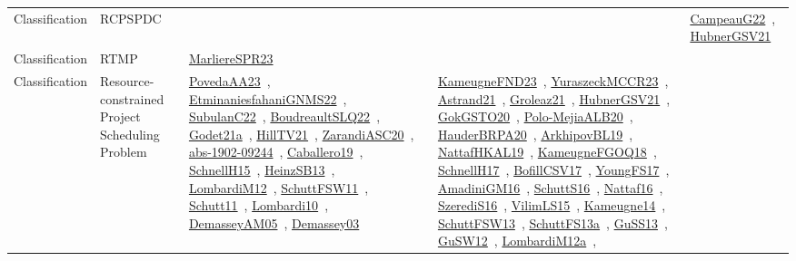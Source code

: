 {\begin{longtable}{lp{3cm}>{\raggedright\arraybackslash}p{6cm}>{\raggedright\arraybackslash}p{6cm}>{\raggedright\arraybackslash}p{8cm}}
Classification & RCPSPDC &  &  & \href{../works/CampeauG22.pdf}{CampeauG22}~\cite{CampeauG22}, \href{../works/HubnerGSV21.pdf}{HubnerGSV21}~\cite{HubnerGSV21}\\
Classification & RTMP & \href{../works/MarliereSPR23.pdf}{MarliereSPR23}~\cite{MarliereSPR23} &  & \\
Classification & Resource-constrained Project Scheduling Problem & \href{../works/PovedaAA23.pdf}{PovedaAA23}~\cite{PovedaAA23}, \href{../works/EtminaniesfahaniGNMS22.pdf}{EtminaniesfahaniGNMS22}~\cite{EtminaniesfahaniGNMS22}, \href{../works/SubulanC22.pdf}{SubulanC22}~\cite{SubulanC22}, \href{../works/BoudreaultSLQ22.pdf}{BoudreaultSLQ22}~\cite{BoudreaultSLQ22}, \href{../works/Godet21a.pdf}{Godet21a}~\cite{Godet21a}, \href{../works/HillTV21.pdf}{HillTV21}~\cite{HillTV21}, \href{../works/ZarandiASC20.pdf}{ZarandiASC20}~\cite{ZarandiASC20}, \href{../works/abs-1902-09244.pdf}{abs-1902-09244}~\cite{abs-1902-09244}, \href{../works/Caballero19.pdf}{Caballero19}~\cite{Caballero19}, \href{../works/SchnellH15.pdf}{SchnellH15}~\cite{SchnellH15}, \href{../works/HeinzSB13.pdf}{HeinzSB13}~\cite{HeinzSB13}, \href{../works/LombardiM12.pdf}{LombardiM12}~\cite{LombardiM12}, \href{../works/SchuttFSW11.pdf}{SchuttFSW11}~\cite{SchuttFSW11}, \href{../works/Schutt11.pdf}{Schutt11}~\cite{Schutt11}, \href{../works/Lombardi10.pdf}{Lombardi10}~\cite{Lombardi10}, \href{../works/DemasseyAM05.pdf}{DemasseyAM05}~\cite{DemasseyAM05}, \href{../works/Demassey03.pdf}{Demassey03}~\cite{Demassey03} & \href{../works/KameugneFND23.pdf}{KameugneFND23}~\cite{KameugneFND23}, \href{../works/YuraszeckMCCR23.pdf}{YuraszeckMCCR23}~\cite{YuraszeckMCCR23}, \href{../works/Astrand21.pdf}{Astrand21}~\cite{Astrand21}, \href{../works/Groleaz21.pdf}{Groleaz21}~\cite{Groleaz21}, \href{../works/HubnerGSV21.pdf}{HubnerGSV21}~\cite{HubnerGSV21}, \href{../works/GokGSTO20.pdf}{GokGSTO20}~\cite{GokGSTO20}, \href{../works/Polo-MejiaALB20.pdf}{Polo-MejiaALB20}~\cite{Polo-MejiaALB20}, \href{../works/HauderBRPA20.pdf}{HauderBRPA20}~\cite{HauderBRPA20}, \href{../works/ArkhipovBL19.pdf}{ArkhipovBL19}~\cite{ArkhipovBL19}, \href{../works/NattafHKAL19.pdf}{NattafHKAL19}~\cite{NattafHKAL19}, \href{../works/KameugneFGOQ18.pdf}{KameugneFGOQ18}~\cite{KameugneFGOQ18}, \href{../works/SchnellH17.pdf}{SchnellH17}~\cite{SchnellH17}, \href{../works/BofillCSV17.pdf}{BofillCSV17}~\cite{BofillCSV17}, \href{../works/YoungFS17.pdf}{YoungFS17}~\cite{YoungFS17}, \href{../works/AmadiniGM16.pdf}{AmadiniGM16}~\cite{AmadiniGM16}, \href{../works/SchuttS16.pdf}{SchuttS16}~\cite{SchuttS16}, \href{../works/Nattaf16.pdf}{Nattaf16}~\cite{Nattaf16}, \href{../works/SzerediS16.pdf}{SzerediS16}~\cite{SzerediS16}, \href{../works/VilimLS15.pdf}{VilimLS15}~\cite{VilimLS15}, \href{../works/Kameugne14.pdf}{Kameugne14}~\cite{Kameugne14}, \href{../works/SchuttFSW13.pdf}{SchuttFSW13}~\cite{SchuttFSW13}, \href{../works/SchuttFS13a.pdf}{SchuttFS13a}~\cite{SchuttFS13a}, \href{../works/GuSS13.pdf}{GuSS13}~\cite{GuSS13}, \href{../works/GuSW12.pdf}{GuSW12}~\cite{GuSW12}, \href{../works/LombardiM12a.pdf}{LombardiM12a}~\cite{LombardiM12a}, 
\end{longtable}}
